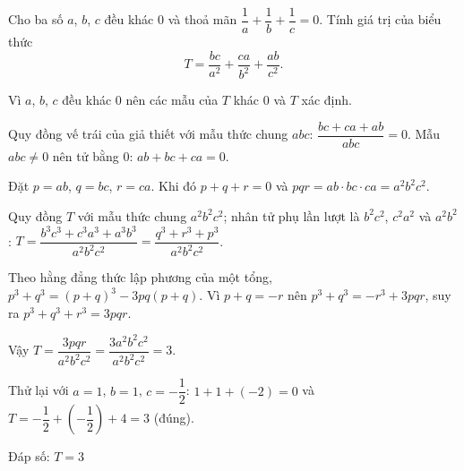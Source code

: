 \begin{problem}[8DS-PS-050]
Cho ba số $a$, $b$, $c$ đều khác $0$ và thoả mãn $\dfrac{1}{a} + \dfrac{1}{b} + \dfrac{1}{c} = 0$. Tính giá trị của biểu thức
\[ T = \dfrac{bc}{a^2} + \dfrac{ca}{b^2} + \dfrac{ab}{c^2}. \]

\begin{solution}
Vì $a$, $b$, $c$ đều khác $0$ nên các mẫu của $T$ khác $0$ và $T$ xác định.

Quy đồng vế trái của giả thiết với mẫu thức chung $abc$: $\dfrac{bc + ca + ab}{abc} = 0$. Mẫu $abc \neq 0$ nên tử bằng $0$: $ab + bc + ca = 0$.

Đặt $p = ab$, $q = bc$, $r = ca$. Khi đó $p + q + r = 0$ và $pqr = ab \cdot bc \cdot ca = a^2b^2c^2$.

Quy đồng $T$ với mẫu thức chung $a^2b^2c^2$; nhân tử phụ lần lượt là $b^2c^2$, $c^2a^2$ và $a^2b^2$: $T = \dfrac{b^3c^3 + c^3a^3 + a^3b^3}{a^2b^2c^2} = \dfrac{q^3 + r^3 + p^3}{a^2b^2c^2}$.

Theo hằng đẳng thức lập phương của một tổng, $p^3 + q^3 = (p + q)^3 - 3pq(p + q)$. Vì $p + q = -r$ nên $p^3 + q^3 = -r^3 + 3pqr$, suy ra $p^3 + q^3 + r^3 = 3pqr$.

Vậy $T = \dfrac{3pqr}{a^2b^2c^2} = \dfrac{3a^2b^2c^2}{a^2b^2c^2} = 3$.

Thử lại với $a = 1$, $b = 1$, $c = -\dfrac{1}{2}$: $1 + 1 + (-2) = 0$ và $T = -\dfrac{1}{2} + \left(-\dfrac{1}{2}\right) + 4 = 3$ (đúng).

Đáp số: $\boxed{T = 3}$
\end{solution}
\end{problem}

